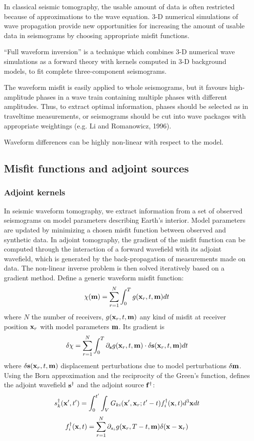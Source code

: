  In classical seismic tomography, the usable amount of data is often restricted
because of approximations to the wave equation.
3-D numerical simulations of wave propagation provide new opportunities for increasing
the amount of usable data in seismograms by choosing appropriate misfit functions.

 ``Full waveform inversion'' is a technique
which combines 3-D numerical wave simulations as a forward theory
with \Frechet kernels computed in 3-D background models,
to fit complete three-component seismograms.

 The waveform misfit is easily applied to whole seismograms,
but it favours high-amplitude phases in a wave train
containing multiple phases with different amplitudes.
Thus, to extract optimal information, phases should be selected as in traveltime measurements,
or seismograms should be cut into wave packages with appropriate weightings
(e.g. Li and Romanowicz, 1996).

Waveform differences can be highly non-linear with respect to the model.

\subsection{Misfit functions and adjoint sources}
\subsubsection{Adjoint kernels}
 In seismic waveform tomography, we extract information from
a set of observed seismograms on model parameters describing Earth's interior.
Model parameters are updated by minimizing a chosen misfit function
between observed and synthetic data.
In adjoint tomography, the gradient of the misfit function can be computed
through the interaction of a forward wavefield with its adjoint wavefield,
which is generated by the back-propagation of measurements made on data.
The non-linear inverse problem is then solved iteratively based on a gradient method.
Define a generic waveform misfit function:
\[ \chi(\mathbf{m})=\sum_{r=1}^N\int_0^Tg(\mathbf{x}_r,t,\mathbf{m})dt \]
where $N$ the number of receivers, $g(\mathbf{x}_r,t,\mathbf{m})$ any kind of misfit
at receiver position $\mathbf{x}_r$ with model parameters $\mathbf{m}$.
Its gradient is
\[ \delta\chi=\sum_{r=1}^N\int_0^T\partial_{\mathbf{s}}g(\mathbf{x}_r,t,\mathbf{m})\cdot\delta\mathbf{s}(\mathbf{x}_r,t,\mathbf{m})dt \]
where $\delta\mathbf{s}(\mathbf{x}_r,t,\mathbf{m})$ displacement perturbations
due to model perturbations $\delta\mathbf{m}$.
Using the Born approximation and the reciprocity of the Green's function,
defines the adjoint wavefield $\mathbf{s}^\dagger$ and the adjoint source $\mathbf{f}^\dagger$:
\[ s_k^\dagger(\mathbf{x}',t')=\int_0^{t'}\int_VG_{ki}(\mathbf{x}',\mathbf{x}_r;t'-t)f_i^\dagger(\mathbf{x},t)d^3\mathbf{x}dt \]
\[ f_i^\dagger(\mathbf{x},t)=\sum_{r=1}^N\partial_{s_i}g(\mathbf{x}_r,T-t,\mathbf{m})\delta(\mathbf{x}-\mathbf{x}_r) \]

